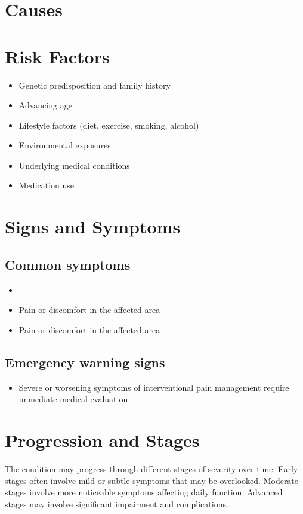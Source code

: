 \section{Causes}
\section{Risk Factors}

\begin{itemize}[noitemsep]
  \item Genetic predisposition and family history
  \item Advancing age
  \item Lifestyle factors (diet, exercise, smoking, alcohol)
  \item Environmental exposures
  \item Underlying medical conditions
  \item Medication use
\end{itemize}
\section{Signs and Symptoms}

\subsection{Common symptoms}
\begin{itemize}[noitemsep]
  \item \item Pain or discomfort in the affected area    \item Pain or discomfort in the affected area
  \end{itemize}

\subsection{Emergency warning signs}
\begin{itemize}[noitemsep]
  \item Severe or worsening symptoms of interventional pain management require immediate medical evaluation
\end{itemize}
\section{Progression and Stages}
The condition may progress through different stages of severity over time. Early stages often involve mild or subtle symptoms that may be overlooked. Moderate stages involve more noticeable symptoms affecting daily function. Advanced stages may involve significant impairment and complications.
